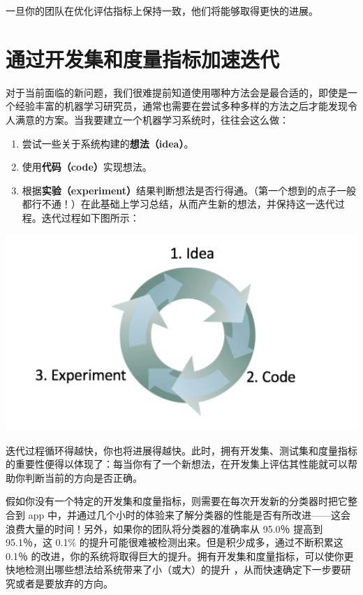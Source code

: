 一旦你的团队在优化评估指标上保持一致，他们将能够取得更快的进展。

\hypertarget{ux901aux8fc7ux5f00ux53d1ux96c6ux548cux5ea6ux91cfux6307ux6807ux52a0ux901fux8fedux4ee3}{%
\chapter{通过开发集和度量指标加速迭代}\label{ux901aux8fc7ux5f00ux53d1ux96c6ux548cux5ea6ux91cfux6307ux6807ux52a0ux901fux8fedux4ee3}}

对于当前面临的新问题，我们很难提前知道使用哪种方法会是最合适的，即使是一个经验丰富的机器学习研究员，通常也需要在尝试多种多样的方法之后才能发现令人满意的方案。当我要建立一个机器学习系统时，往往会这么做：

\begin{enumerate}
\def\labelenumi{\arabic{enumi}.}
\tightlist
\item
  尝试一些关于系统构建的\textbf{想法（idea）}。
\item
  使用\textbf{代码（code）}实现想法。
\item
  根据\textbf{实验（experiment）}结果判断想法是否行得通。（第一个想到的点子一般都行不通！）在此基础上学习总结，从而产生新的想法，并保持这一迭代过程。迭代过程如下图所示：
\end{enumerate}

\includegraphics{./img/ch10_01.png}

迭代过程循环得越快，你也将进展得越快。此时，拥有开发集、测试集和度量指标的重要性便得以体现了：每当你有了一个新想法，在开发集上评估其性能就可以帮助你判断当前的方向是否正确。

假如你没有一个特定的开发集和度量指标，则需要在每次开发新的分类器时把它整合到
app
中，并通过几个小时的体验来了解分类器的性能是否有所改进------这会浪费大量的时间！另外，如果你的团队将分类器的准确率从
95.0％ 提高到 95.1％，这 0.1\%
的提升可能很难被检测出来。但是积少成多，通过不断积累这 0.1％
的改进，你的系统将取得巨大的提升。拥有开发集和度量指标，可以使你更快地检测出哪些想法给系统带来了小（或大）的提升
，从而快速确定下一步要研究或者是要放弃的方向。


